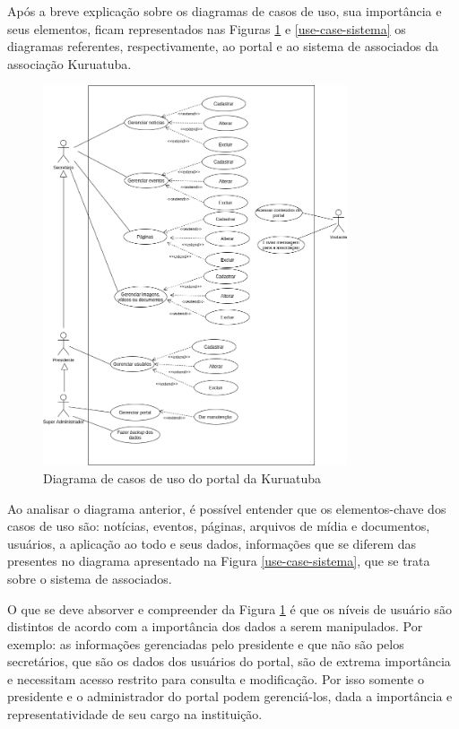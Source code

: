 Após a breve explicação sobre os diagramas de casos de uso, sua importância e seus elementos, ficam representados nas Figuras \ref{use-case-portal} e \ref{use-case-sistema} os diagramas referentes, respectivamente, ao portal e ao sistema de associados da associação Kuruatuba.

\newpage

\begin{figure}[htb]
 \centering
 \caption{Diagrama de casos de uso do portal da Kuruatuba}
 \includegraphics[width=0.8\textwidth]{figuras/use-case-portal.png}
 
 \label{use-case-portal}
\end{figure}

Ao analisar o diagrama anterior, é possível entender que os elementos-chave dos casos de uso são: notícias, eventos, páginas, arquivos de mídia e documentos, usuários, a aplicação ao todo e seus dados, informações que se diferem das presentes no diagrama apresentado na Figura \ref{use-case-sistema}, que se trata sobre o sistema de associados. 

O que se deve absorver e compreender da Figura \ref{use-case-portal} é que os níveis de usuário são distintos de acordo com a importância dos dados a serem manipulados. Por exemplo: as informações gerenciadas pelo presidente e que não são pelos secretários, que são os dados dos usuários do portal, são de extrema importância e necessitam acesso restrito para consulta e modificação. Por isso somente o presidente e o administrador do portal podem gerenciá-los, dada a importância e representatividade de seu cargo na instituição. 

